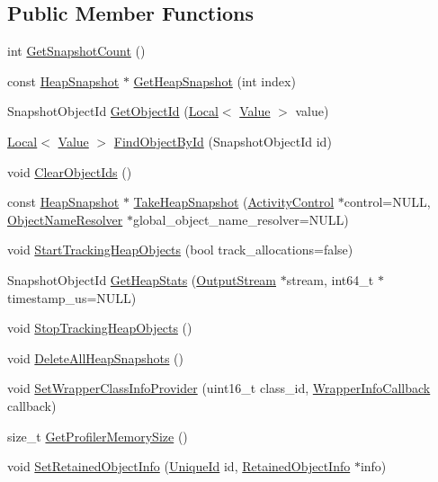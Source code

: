 \subsection*{Public Member Functions}
\begin{DoxyCompactItemize}
\item 
int \hyperlink{classv8_1_1HeapProfiler_a24830775a0ab938eb0a29ed8f3dfd265}{Get\+Snapshot\+Count} ()
\item 
const \hyperlink{classv8_1_1HeapSnapshot}{Heap\+Snapshot} $\ast$ \hyperlink{classv8_1_1HeapProfiler_af9093f6ca6e5558315f354c7ccb55484}{Get\+Heap\+Snapshot} (int index)
\item 
Snapshot\+Object\+Id \hyperlink{classv8_1_1HeapProfiler_ab926a1f1ed95b731d4ef3133e67eef19}{Get\+Object\+Id} (\hyperlink{classv8_1_1Local}{Local}$<$ \hyperlink{classv8_1_1Value}{Value} $>$ value)
\item 
\hyperlink{classv8_1_1Local}{Local}$<$ \hyperlink{classv8_1_1Value}{Value} $>$ \hyperlink{classv8_1_1HeapProfiler_ace729f9b7dbb2ca8b2fd67551bf5aae8}{Find\+Object\+By\+Id} (Snapshot\+Object\+Id id)
\item 
void \hyperlink{classv8_1_1HeapProfiler_a8a90c630543ed1875cbf9166239ff8d3}{Clear\+Object\+Ids} ()
\item 
const \hyperlink{classv8_1_1HeapSnapshot}{Heap\+Snapshot} $\ast$ \hyperlink{classv8_1_1HeapProfiler_a4af9159585ab024175d8eff551804ea8}{Take\+Heap\+Snapshot} (\hyperlink{classv8_1_1ActivityControl}{Activity\+Control} $\ast$control=N\+U\+L\+L, \hyperlink{classv8_1_1HeapProfiler_1_1ObjectNameResolver}{Object\+Name\+Resolver} $\ast$global\+\_\+object\+\_\+name\+\_\+resolver=N\+U\+L\+L)
\item 
void \hyperlink{classv8_1_1HeapProfiler_a02917db133b7efd468c9c73075a15171}{Start\+Tracking\+Heap\+Objects} (bool track\+\_\+allocations=false)
\item 
Snapshot\+Object\+Id \hyperlink{classv8_1_1HeapProfiler_a756d71126e0effc7543fb33e856dd738}{Get\+Heap\+Stats} (\hyperlink{classv8_1_1OutputStream}{Output\+Stream} $\ast$stream, int64\+\_\+t $\ast$timestamp\+\_\+us=N\+U\+L\+L)
\item 
void \hyperlink{classv8_1_1HeapProfiler_ae448d9474ae34781133d4a4547b08cb1}{Stop\+Tracking\+Heap\+Objects} ()
\item 
void \hyperlink{classv8_1_1HeapProfiler_a6a75bcc6d8350858597b6a6ce5e349a2}{Delete\+All\+Heap\+Snapshots} ()
\item 
void \hyperlink{classv8_1_1HeapProfiler_a7744cf111ad9c6b0b409841f8ed8bcdd}{Set\+Wrapper\+Class\+Info\+Provider} (uint16\+\_\+t class\+\_\+id, \hyperlink{classv8_1_1HeapProfiler_a677025dd201fd832e0464e5ab0b0d0d4}{Wrapper\+Info\+Callback} callback)
\item 
size\+\_\+t \hyperlink{classv8_1_1HeapProfiler_a76435e93466db7519fb31417ea39b13e}{Get\+Profiler\+Memory\+Size} ()
\item 
void \hyperlink{classv8_1_1HeapProfiler_a70821ff8e1c2cc92c310c5c4f1fa5ec7}{Set\+Retained\+Object\+Info} (\hyperlink{classv8_1_1UniqueId}{Unique\+Id} id, \hyperlink{classv8_1_1RetainedObjectInfo}{Retained\+Object\+Info} $\ast$info)
\end{DoxyCompactItemize}
